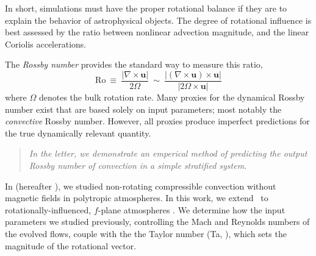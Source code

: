 \documentclass[twocolumn, amsmath, amsfonts, amssymb]{aastex62}
\newcommand{\gv}[1]{{\color{blue} #1}}
\begin{document}

In short, simulations must have the proper rotational balance if they are to explain the behavior of astrophysical objects. 
The degree of rotational influence is best assessed by the ratio between  nonlinear advection magnitude, and the linear Coriolis accelerations. 
\gv{The \textit{Rossby number} provides the standard way to measure this ratio, 
\begin{equation}
\text{Ro} \ \equiv \ \frac{| \nabla \times \boldsymbol{u} | }{2 \Omega} \ \sim \ \frac{| (\nabla \times \boldsymbol{u}) \times \boldsymbol{u}  | }{|2 \Omega \times \boldsymbol{u}|} \label{Rossby-def}
\end{equation}
where $\Omega$ denotes the bulk rotation rate. 
Many proxies for the dynamical Rossby number exist that are based solely on input parameters; most notably the \textit{convective} Rossby number. 
However, all proxies produce imperfect predictions for the true dynamically relevant quantity.
\begin{quote}
\emph{In the letter, we demonstrate an emperical method of predicting the output Rossby number
of convection in a simple stratified system.}
\end{quote}}
In \cite{anders&brown2017} (hereafter \AB), we studied non-rotating compressible convection without magnetic fields in polytropic atmospheres. 
In this work, we extend \AB$\,$ to rotationally-influenced, $f$-plane
atmospheres 
\cite[e.g.][]{brummell&all1996, brummell&all1998, calkins&all2015a}. 
We determine how the input parameters we studied previously, controlling the Mach and
Reynolds numbers of the evolved flows, couple with the the Taylor number (Ta, \cite{julien&all1996}), which sets the magnitude of the rotational vector. 
\end{document}
